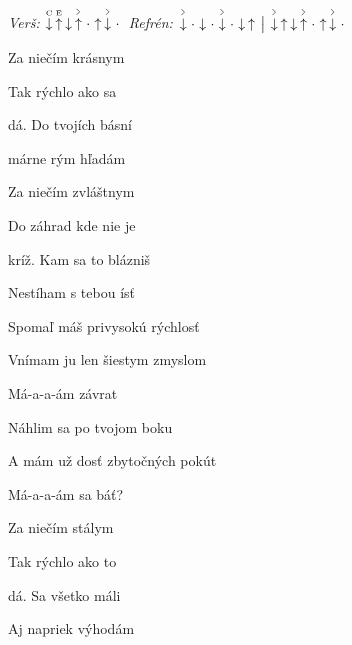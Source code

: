 \begin{song}


\begin{headerbox}
\textit{Verš:} $\PluckDown{C}\PluckUp{E}\Down\AccentUp\Miss\Up\AccentDown\Miss$ \quad
\textit{Refrén:} $\AccentDown\Miss\Down\Miss\AccentDown\Miss\Down\Up \Separator \AccentDown\Up\Down\AccentUp\Miss\Up\AccentDown\Miss$
\end{headerbox}

\begin{chordbox}
 \par
{} \par
{} \par
{} \par
\end{chordbox}

\Large

\bigskip


 Za niečím krásnym \par
{} Tak rýchlo ako sa \par
{}dá. Do tvojích básní \par
{}márne rým hľadám \par

\bigskip

 Za niečím zvláštnym \par
{} Do záhrad kde nie je \par
{}kríž. Kam sa to blázniš \par
Nestíham s tebou ísť \par

\bigskip

Spomaľ máš privysokú rýchlosť \par
{}Vnímam ju len šiestym zmyslom \par
{}Má-a-a-ám závrat  \par
{}Náhlim sa po tvojom boku \par
A mám už dosť zbytočných pokút \par
{}Má-a-a-ám sa báť?  \par

\bigskip

 Za niečím stálym \par
{} Tak rýchlo ako to \par
{}dá. Sa všetko máli \par
Aj napriek výhodám \par


\end{song}
